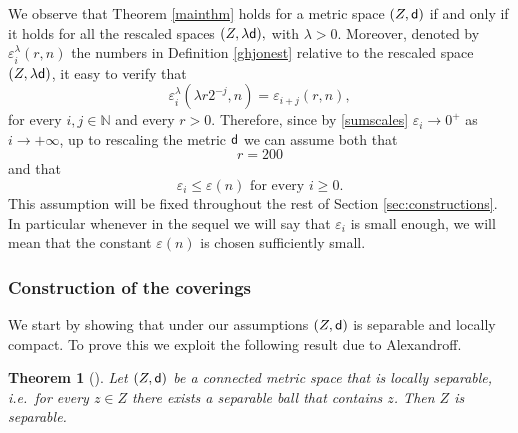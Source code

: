 \documentclass[11pt]{article}
\newcommand{\eps}{\varepsilon}
\newcommand{\sfd}{{\sf d}}
\theoremstyle{plain}
\newtheorem{theorem}{Theorem}[section]
\theoremstyle{definition}
\numberwithin{equation}{section}
\begin{document}
We observe that Theorem \ref{mainthm} holds for a metric space $(Z,\sfd)$ if and only if it holds for all the rescaled spaces $(Z,\lambda\sfd),$ with $\lambda>0.$ Moreover, denoted by $\eps_i^{\lambda}(r,n)$ the numbers in Definition \ref{ghjonest} relative to the rescaled space $(Z,\lambda \sfd)$, it easy to verify that 
$$\eps_i^\lambda(\lambda r 2^{-j},n)=\eps_{i+j}(r,n),$$
for every $i,j \in \mathbb{N}$ and every $r>0$.
Therefore, since by \eqref{sumscales} $\eps_i \to 0^+$ as $i \to +\infty$, up to rescaling the metric $\sfd$ we can assume both that
\begin{equation}\label{ass1}
	r=200
\end{equation}
and that
\begin{equation}\label{ass2}
	\eps_i\le \eps(n) \text{ for every } i \ge 0. 
\end{equation}
This assumption will be fixed throughout the rest of Section \ref{sec:constructions}. In particular whenever in the sequel we will say  that  $\eps_i$ is small enough, we will mean that the constant $\eps(n)$ is chosen sufficiently small.




\subsubsection{Construction of the coverings}\label{sec:coverings}
We start by showing that under our assumptions $(Z,\sfd)$ is separable and locally compact. 
To prove this we exploit the following result due to Alexandroff.
\begin{theorem}[\hspace{1sp}\cite{alexandrov}]\label{thm:alex}
	Let $(Z,\sfd)$ be a connected metric space that is locally separable, i.e.\ for every $z \in Z	$ there exists a separable ball  that contains $z$.  Then $Z$ is separable.
\end{theorem}
\end{document}
